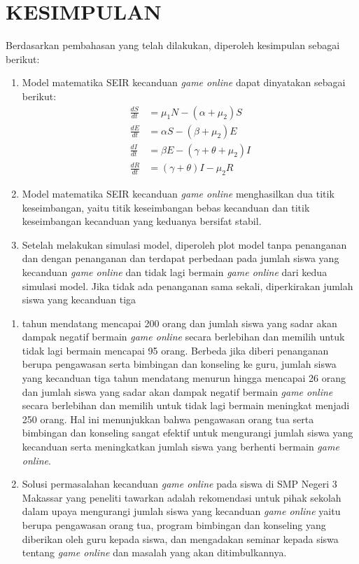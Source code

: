 \documentclass[a4paper, 12pt]{article}
\newcommand{\runninghead}[1]{%
  \fancyhead[L]{#1}
  \fancyhead[R]{\thepage}
}
\begin{document}
\section{KESIMPULAN}
Berdasarkan pembahasan yang telah dilakukan, diperoleh kesimpulan sebagai berikut:
\begin{enumerate}
    \item Model matematika SEIR kecanduan \textit{game online} dapat dinyatakan sebagai berikut:
    \begin{align*}
        \frac{dS}{dt} &= \mu_1 N - (\alpha + \mu_2)S \\
        \frac{dE}{dt} &= \alpha S - (\beta + \mu_2)E \\
        \frac{dI}{dt} &= \beta E - (\gamma + \theta + \mu_2)I \\
        \frac{dR}{dt} &= (\gamma + \theta)I - \mu_2 R
    \end{align*}
    \item Model matematika SEIR kecanduan \textit{game online} menghasilkan dua titik keseimbangan, yaitu titik keseimbangan bebas kecanduan dan titik keseimbangan kecanduan yang keduanya bersifat stabil.
    \item Setelah melakukan simulasi model, diperoleh plot model tanpa penanganan dan dengan penanganan dan terdapat perbedaan pada jumlah siswa yang kecanduan \textit{game online} dan tidak lagi bermain \textit{game online} dari kedua simulasi model. Jika tidak ada penanganan sama sekali, diperkirakan jumlah siswa yang kecanduan tiga
\end{enumerate}

\clearpage
\runninghead{Side (2020)}
\setcounter{page}{101}

\begin{enumerate}[resume]
    \item[] tahun mendatang mencapai 200 orang dan jumlah siswa yang sadar akan dampak negatif bermain \textit{game online} secara berlebihan dan memilih untuk tidak lagi bermain mencapai 95 orang. Berbeda jika diberi penanganan berupa pengawasan serta bimbingan dan konseling ke guru, jumlah siswa yang kecanduan tiga tahun mendatang menurun hingga mencapai 26 orang dan jumlah siswa yang sadar akan dampak negatif bermain \textit{game online} secara berlebihan dan memilih untuk tidak lagi bermain meningkat menjadi 250 orang. Hal ini menunjukkan bahwa pengawasan orang tua serta bimbingan dan konseling sangat efektif untuk mengurangi jumlah siswa yang kecanduan serta meningkatkan jumlah siswa yang berhenti bermain \textit{game online}.
    \item Solusi permasalahan kecanduan \textit{game online} pada siswa di SMP Negeri 3 Makassar yang peneliti tawarkan adalah rekomendasi untuk pihak sekolah dalam upaya mengurangi jumlah siswa yang kecanduan \textit{game online} yaitu berupa pengawasan orang tua, program bimbingan dan konseling yang diberikan oleh guru kepada siswa, dan mengadakan seminar kepada siswa tentang \textit{game online} dan masalah yang akan ditimbulkannya.
\end{enumerate}
\end{document}
